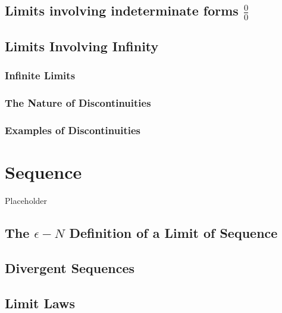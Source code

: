 \documentclass[
]{book}
\theoremstyle{definition}
\theoremstyle{definition}
\theoremstyle{definition}
\theoremstyle{definition}
\theoremstyle{remark}
\begin{document}
\section{\texorpdfstring{Limits involving indeterminate forms \(\frac{0}{0}\)}{Limits involving indeterminate forms \textbackslash frac\{0\}\{0\}}}\label{limits-involving-indeterminate-forms-frac00}

\section{Limits Involving Infinity}\label{limits-involving-infinity}

\subsection{Infinite Limits}\label{infinite-limits}

\subsection{The Nature of Discontinuities}\label{the-nature-of-discontinuities}

\subsection{Examples of Discontinuities}\label{examples-of-discontinuities}

\chapter{Sequence}\label{sequence}

Placeholder

\section{\texorpdfstring{The \(\epsilon- N\) Definition of a Limit of Sequence}{The \textbackslash epsilon- N Definition of a Limit of Sequence}}\label{the-epsilon--n-definition-of-a-limit-of-sequence}

\section{Divergent Sequences}\label{divergent-sequences}

\section{Limit Laws}\label{limit-laws}
\end{document}
